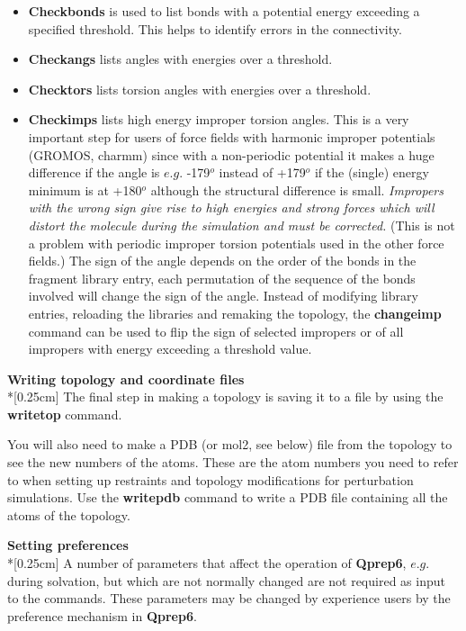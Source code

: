 \documentclass[a4paper,11pt]{article}
\begin{document}
\begin{itemize}
\item \textbf{Checkbonds} is used to list bonds with a potential energy
exceeding a specified threshold. This helps to identify errors in
the connectivity.
\item \textbf{Checkangs} lists angles with energies over a threshold.
\item \textbf{Checktors} lists torsion angles with energies over a threshold.
\item \textbf{Checkimps}  lists high energy improper torsion angles. This is
a very important step for users of force fields with harmonic
improper potentials (GROMOS, charmm) since with a non-periodic
potential it makes a huge difference if the angle is $e.g.$
-179$^{o}$ instead of +179$^{o}$ if the (single) energy minimum is
at +180$^{o}$ although the structural difference is small.
\textit{Impropers with the wrong sign give rise to high energies
and strong forces which will distort the molecule during the
simulation and must be corrected.} (This is not a problem with
periodic improper torsion potentials used in the other force
fields.) The sign of the angle depends on the order of the bonds
in the fragment library entry, each permutation of the sequence of
the bonds involved will change the sign of the angle. Instead of
modifying library entries, reloading the libraries and remaking
the topology, the \textbf{changeimp} command can be used to flip
the sign of selected impropers or of all impropers with energy
exceeding a threshold value.
\end{itemize}

\textbf{Writing topology and coordinate files}\\*[0.25cm] The
final step in making a topology is saving it to a file by using
the \textbf{writetop} command.

You will also need to make a PDB (or mol2, see below) file from
the topology to see the new numbers of the atoms. These are the
atom numbers you need to refer to when setting up restraints and
topology modifications for perturbation simulations. Use the
\textbf{writepdb} command to write a PDB file containing all the
atoms of the topology.

\textbf{Setting preferences}\label{setting_pref}\\*[0.25cm] A
number of parameters that affect the operation of \textbf{Qprep6}, $e.g.$
during solvation, but which are not normally changed are not
required as input to the commands. These parameters may be changed
by experience users by the preference mechanism in \textbf{Qprep6}.
\end{document}
